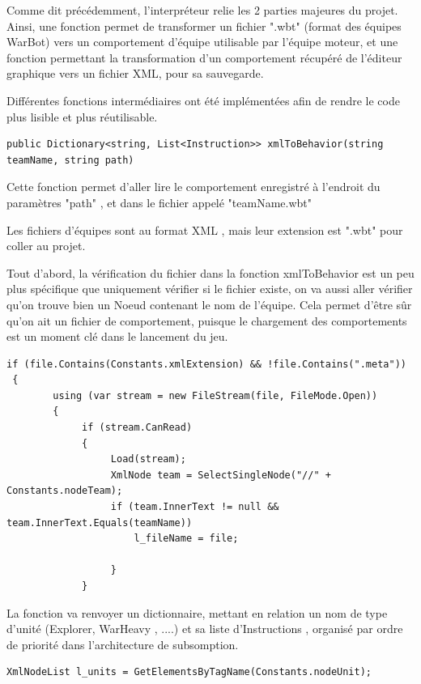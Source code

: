 \documentclass{report}
\begin{document}
Comme dit précédemment, l'interpréteur relie les 2 parties majeures du projet.
Ainsi, une fonction permet de transformer un fichier ".wbt" (format des équipes WarBot) vers un comportement d'équipe utilisable par l'équipe moteur, et une fonction permettant la transformation d'un comportement récupéré de l'éditeur graphique vers un fichier XML, pour sa sauvegarde.

Différentes fonctions intermédiaires ont été implémentées afin de rendre le code plus lisible et plus réutilisable.
\begin{lstlisting}[frame=single]
public Dictionary<string, List<Instruction>> xmlToBehavior(string teamName, string path)
\end{lstlisting}
Cette fonction permet d'aller lire le comportement enregistré à l'endroit du paramètres "path" , et dans le fichier appelé "teamName.wbt"

Les fichiers d'équipes sont au format XML , mais leur extension est ".wbt" pour coller au projet.

Tout d'abord, la vérification du fichier dans la fonction xmlToBehavior est un peu plus spécifique que uniquement vérifier si le fichier existe, on va aussi aller vérifier qu'on trouve bien un Noeud contenant le nom de l'équipe. Cela permet d'être sûr qu'on ait un fichier de comportement, puisque le chargement des comportements est un moment clé dans le lancement du jeu.

\begin{lstlisting}[frame=single]
 if (file.Contains(Constants.xmlExtension) && !file.Contains(".meta"))
 {
        using (var stream = new FileStream(file, FileMode.Open))
        {
             if (stream.CanRead)
             {
                  Load(stream);
                  XmlNode team = SelectSingleNode("//" + Constants.nodeTeam);
                  if (team.InnerText != null && team.InnerText.Equals(teamName))
                      l_fileName = file;

                  }
             }

\end{lstlisting}


La fonction va renvoyer un dictionnaire, mettant en relation un nom de type d'unité (Explorer, WarHeavy , ....) et sa liste d'Instructions , organisé par ordre de priorité dans l'architecture de subsomption.

\begin{lstlisting}[frame=single]
XmlNodeList l_units = GetElementsByTagName(Constants.nodeUnit);
\end{lstlisting}
\end{document}
